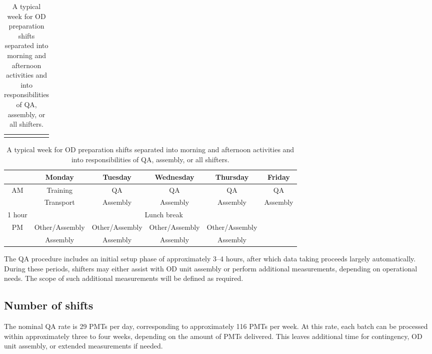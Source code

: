 \documentclass[12pt,a4paper]{article}
\begin{document}
\begin{table}[]
    \centering
    \begin{tabular}{ccc}
        \color{blue!85!black}{\textbf{QA shifters}} &
        \color{green!65!black}{\textbf{Assembly shifters}} &
        \color{violet!95!black}{\textbf{All shifters}}
    \end{tabular}
    \begin{tabular}{|c|c|c|c|c|c|}
        \hline
        & Monday & Tuesday & Wednesday & Thursday & Friday  \\
        \hline
        \multirow{2}{*}{AM} &
        \color{violet!95!black} Training &
        \color{blue!85!black} QA & \color{blue!85!black} QA & \color{blue!85!black} QA & \color{blue!85!black} QA \\
        & \color{violet!95!black} Transport & \color{green!65!black} Assembly & 
        \color{green!65!black} Assembly & \color{green!65!black} Assembly &
        \color{green!65!black} Assembly \\
        \hline
        1 hour & \multicolumn{5}{c|}{Lunch break}\\
        \hline
        \multirow{2}{*}{PM} & \color{blue!85!black} Other/Assembly &
        \color{blue!85!black} Other/Assembly & \color{blue!85!black} Other/Assembly &
        \color{blue!85!black} Other/Assembly & \color{violet!95!black} \multirow{2}{*}{Transport} \\
        & \color{green!65!black} Assembly & \color{green!65!black} Assembly &
        \color{green!65!black} Assembly & \color{green!65!black} Assembly & \\
        \hline
    \end{tabular}
    \caption{A typical week for OD preparation shifts separated into morning and afternoon activities and into responsibilities of QA, assembly, or all shifters.}
    \label{tab:typicalweek}
\end{table}

The QA procedure includes an initial setup phase of approximately 3–4 hours, after which data taking proceeds largely automatically. During these periods, shifters may either assist with OD unit assembly or perform additional measurements, depending on operational needs. The scope of such additional measurements will be defined as required.

\subsection{Number of shifts}
The nominal QA rate is 29 PMTs per day, corresponding to approximately 116 PMTs per week. At this rate, each batch can be processed within approximately three to four weeks, depending on the amount of PMTs delivered. This leaves additional time for contingency, OD unit assembly, or extended measurements if needed.
\end{document}
